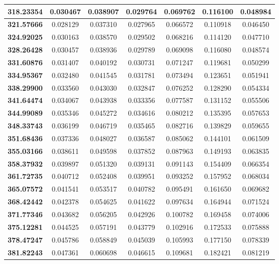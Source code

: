 \documentclass[10pt, a4paper]{article}
\begin{document}
\begin{appendices}
\begin{longtable}{|c|c|c|c|c|c|c|}
	\textbf{318.23354} & 0.030467 & 0.038907 & 0.029764 & 0.069762 & 0.116100 & 0.048984 \\ \hline
	\textbf{321.57666} & 0.028129 & 0.037310 & 0.027965 & 0.066572 & 0.110918 & 0.046450 \\ \hline
	\textbf{324.92025} & 0.030163 & 0.038570 & 0.029502 & 0.068216 & 0.114120 & 0.047710 \\ \hline
	\textbf{328.26428} & 0.030457 & 0.038936 & 0.029789 & 0.069098 & 0.116080 & 0.048574 \\ \hline
	\textbf{331.60876} & 0.031407 & 0.040192 & 0.030731 & 0.071247 & 0.119681 & 0.050299 \\ \hline
	\textbf{334.95367} & 0.032480 & 0.041545 & 0.031781 & 0.073494 & 0.123651 & 0.051941 \\ \hline
	\textbf{338.29900} & 0.033560 & 0.043030 & 0.032847 & 0.076252 & 0.128290 & 0.054334 \\ \hline
	\textbf{341.64474} & 0.034067 & 0.043938 & 0.033356 & 0.077587 & 0.131152 & 0.055506 \\ \hline
	\textbf{344.99089} & 0.035346 & 0.045272 & 0.034616 & 0.080212 & 0.135395 & 0.057653 \\ \hline
	\textbf{348.33743} & 0.036199 & 0.046719 & 0.035465 & 0.082716 & 0.139829 & 0.059655 \\ \hline
	\textbf{351.68436} & 0.037336 & 0.048027 & 0.036587 & 0.085062 & 0.144101 & 0.061509 \\ \hline
	\textbf{355.03166} & 0.038611 & 0.049598 & 0.037852 & 0.087963 & 0.149193 & 0.063835 \\ \hline
	\textbf{358.37932} & 0.039897 & 0.051320 & 0.039131 & 0.091143 & 0.154409 & 0.066354 \\ \hline
	\textbf{361.72735} & 0.040712 & 0.052408 & 0.039951 & 0.093252 & 0.157952 & 0.068034 \\ \hline
	\textbf{365.07572} & 0.041541 & 0.053517 & 0.040782 & 0.095491 & 0.161650 & 0.069682 \\ \hline
	\textbf{368.42442} & 0.042378 & 0.054625 & 0.041622 & 0.097634 & 0.164944 & 0.071524 \\ \hline
	\textbf{371.77346} & 0.043682 & 0.056205 & 0.042926 & 0.100782 & 0.169458 & 0.074006 \\ \hline
	\textbf{375.12281} & 0.044525 & 0.057191 & 0.043779 & 0.102916 & 0.172533 & 0.075888 \\ \hline
	\textbf{378.47247} & 0.045786 & 0.058849 & 0.045039 & 0.105993 & 0.177150 & 0.078339 \\ \hline
	\textbf{381.82243} & 0.047361 & 0.060698 & 0.046615 & 0.109681 & 0.182421 & 0.081219 \\ \hline

\end{longtable}
\end{appendices}
\end{document}
